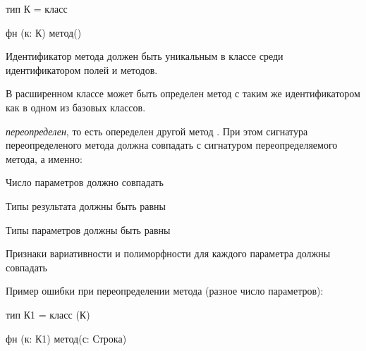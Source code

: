 \begin{Trivil}
тип К = класс {}

фн (к: К) метод() {}
\end{Trivil}

Идентификатор метода должен быть уникальным в классе среди идентификатором полей и методов. 

В расширенном классе может быть определен метод с таким же идентификатором как в одном из базовых классов.

\emph{переопределен}, то есть опеределен другой метод . При этом сигнатура переопределеного метода должна совпадать с сигнатуром переопределяемого метода, а именно:
\begin{d_itemize}
\item
    Число параметров должно совпадать
\item
    Типы  результата должны быть равны 
\item
    Типы  параметров должны быть равны 
\item 
    Признаки вариативности и полиморфности для каждого параметра должны совпадать
\end{d_itemize}

Пример ошибки при переопределении метода (разное число параметров):
\begin{SampleErr}[vspace=2pt]
тип К1 = класс (К) {}

фн (к: К1) метод(с: Строка) {}
\end{SampleErr}
